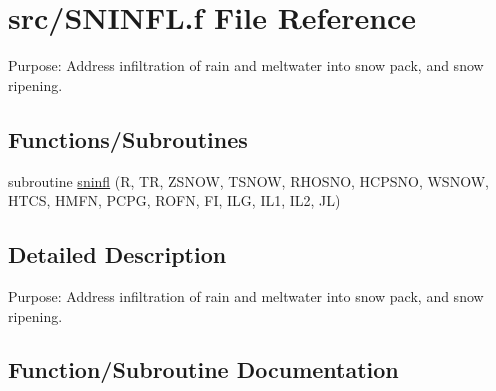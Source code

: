 \hypertarget{SNINFL_8f}{}\section{src/\+S\+N\+I\+N\+F\+L.f File Reference}
\label{SNINFL_8f}


Purpose\+: Address infiltration of rain and meltwater into snow pack, and snow ripening.  


\subsection*{Functions/\+Subroutines}
\begin{DoxyCompactItemize}
\item 
subroutine \hyperlink{SNINFL_8f_a40705488cafaec0ed712b2b926c1d67d}{sninfl} (R, T\+R, Z\+S\+N\+O\+W, T\+S\+N\+O\+W, R\+H\+O\+S\+N\+O, H\+C\+P\+S\+N\+O, W\+S\+N\+O\+W, H\+T\+C\+S, H\+M\+F\+N, P\+C\+P\+G, R\+O\+F\+N, F\+I, I\+L\+G, I\+L1, I\+L2, J\+L)
\end{DoxyCompactItemize}


\subsection{Detailed Description}
Purpose\+: Address infiltration of rain and meltwater into snow pack, and snow ripening. 



\subsection{Function/\+Subroutine Documentation}
\hypertarget{SNINFL_8f_a40705488cafaec0ed712b2b926c1d67d}{}
